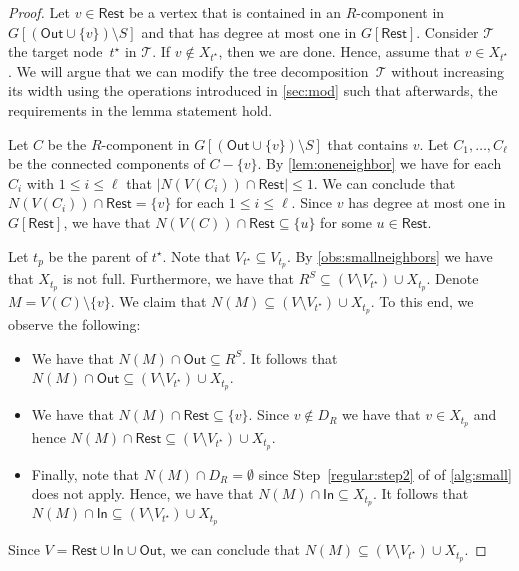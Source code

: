 \documentclass[a4paper,UKenglish,cleveref, autoref, thm-restate, numberwithinsect]{lipics-v2021}
\newcommand{\In}{\mathsf{In}}
\newcommand{\Out}{\mathsf{Out}}
\newcommand{\Rest}{\mathsf{Rest}}
\begin{document}
\begin{proof}
Let $v\in\Rest$ be a vertex that is contained in an $R$-component in $G[(\Out\cup\{v\})\setminus S]$ and that has degree at most one in $G[\Rest]$. 
Consider $\mathcal{T}$ the target node~$t^\star$ in $\mathcal{T}$.
If $v\notin X_{t^\star}$, then we are done. 
Hence, assume that $v\in X_{t^\star}$. 
We will argue that we can modify the tree decomposition~$\mathcal{T}$ without increasing its width using the operations introduced in \cref{sec:mod} such that afterwards, the requirements in the lemma statement hold.

Let $C$ be the $R$-component in $G[(\Out\cup\{v\})\setminus S]$ that contains $v$. 
 Let $C_1,\ldots,C_\ell$ be the connected components of $C-\{v\}$. By \cref{lem:oneneighbor} we have for each $C_i$ with $1\le i\le \ell$ that $|N(V(C_i))\cap\Rest|\le 1$. We can conclude that $N(V(C_i))\cap\Rest=\{v\}$ for each $1\le i\le \ell$. Since $v$ has degree at most one in $G[\Rest]$, we have that $N(V(C))\cap \Rest\subseteq\{u\}$ for some $u\in \Rest$. 


    Let $t_p$ be the parent of ${t^\star}$. Note that $V_{t^\star}\subseteq V_{t_p}$. By \cref{obs:smallneighbors} we have that $X_{t_p}$ is not full.
         Furthermore, we have that $R^S\subseteq (V\setminus V_{{t^\star}})\cup X_{t_p}$. Denote $M=V(C)\setminus \{v\}$. We claim that $N(M)\subseteq (V\setminus V_{t^\star})\cup X_{t_p}$. 
         To this end, we observe the following:
         \begin{itemize}
             \item We have that $N(M)\cap \Out\subseteq R^S$. It follows that $N(M)\cap \Out\subseteq (V\setminus V_{t^\star})\cup X_{t_p}$. 
             \item We have that $N(M)\cap \Rest\subseteq \{v\}$. Since $v\notin D_R$ we have that $v\in X_{t_p}$ and hence $N(M)\cap \Rest\subseteq (V\setminus V_{t^\star})\cup X_{t_p}$.
             \item Finally, note that $N(M)\cap D_R=\emptyset$ since Step~\ref{regular:step2} of of \cref{alg:small} does not apply. Hence, we have that $N(M)\cap \In\subseteq X_{t_p}$. It follows that $N(M)\cap \In\subseteq (V\setminus V_{t^\star})\cup X_{t_p}$
         \end{itemize}
         Since $V=\Rest\cup\In\cup\Out$, we can conclude that $N(M)\subseteq (V\setminus V_{t^\star})\cup X_{t_p}$.


        
        

\end{proof}
\end{document}

